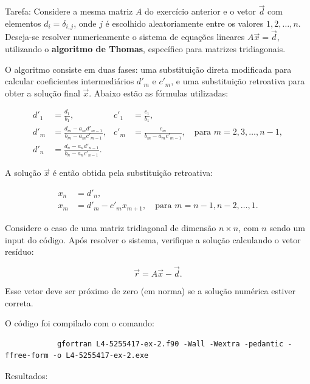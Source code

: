 \documentclass[12pt, a4paper]{article} %
\begin{document}
        Tarefa: Considere a mesma matriz $A$ do exerc\'icio anterior e o vetor $\vec{d}$ com elementos $d_i = \delta_{i,j}$, onde $j$ \'e escolhido aleatoriamente entre os valores $1, 2, \dots, n$. Deseja-se resolver numericamente o sistema de equa\c{c}\~oes lineares $A \vec{x} = \vec{d}$, utilizando o \textbf{algoritmo de Thomas}, espec\'ifico para matrizes tridiagonais.

        O algoritmo consiste em duas fases: uma substitui\c{c}\~ao direta modificada para calcular coeficientes intermedi\'arios $d'_m$ e $c'_m$, e uma substitui\c{c}\~ao retroativa para obter a solu\c{c}\~ao final $\vec{x}$. Abaixo est\~ao as f\'ormulas utilizadas:
        
        \begin{align*}
        d'_1 &= \frac{d_1}{b_1}, &
        c'_1 &= \frac{c_1}{b_1}, \\
        d'_m &= \frac{d_m - a_m d'_{m-1}}{b_m - a_m c'_{m-1}}, &
        c'_m &= \frac{c_m}{b_m - a_m c'_{m-1}}, \quad \text{para } m = 2, 3, \dots, n-1, \\
        d'_n &= \frac{d_n - a_n d'_{n-1}}{b_n - a_n c'_{n-1}}.
        \end{align*}
        
        A solu\c{c}\~ao $\vec{x}$ \'e ent\~ao obtida pela substitui\c{c}\~ao retroativa:
        
        \begin{align*}
        x_n &= d'_n, \\
        x_m &= d'_m - c'_m x_{m+1}, \quad \text{para } m = n-1, n-2, \dots, 1.
        \end{align*}
        
        Considere o caso de uma matriz tridiagonal de dimens\~ao $n \times n$, com $n$ sendo um input do c\'odigo. Ap\'os resolver o sistema, verifique a solu\c{c}\~ao calculando o vetor res\'iduo:
        
        \[
        \vec{r} = A\vec{x} - \vec{d}.
        \]
        
        Esse vetor deve ser pr\'oximo de zero (em norma) se a solu\c{c}\~ao num\'erica estiver correta.        

        O c\'odigo foi compilado com o comando:
        \begin{verbatim}
            gfortran L4-5255417-ex-2.f90 -Wall -Wextra -pedantic -ffree-form -o L4-5255417-ex-2.exe  
        \end{verbatim}

        Resultados:
\end{document}
